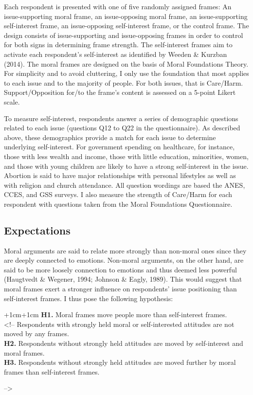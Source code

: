 \documentclass[12pt,econ]{sources/authesis}
\begin{document}
Each respondent is presented with one of five randomly assigned frames: An issue-supporting moral frame, an issue-opposing moral frame, an issue-supporting self-interest frame, an issue-opposing self-interest frame, or the control frame. The design consists of issue-supporting and issue-opposing frames in order to control for both signs in determining frame strength. The self-interest frames aim to activate each respondent's self-interest as identified by Weeden \& Kurzban (2014). The moral frames are designed on the basis of Moral Foundations Theory. For simplicity and to avoid cluttering, I only use the foundation that most applies to each issue and to the majority of people. For both issues, that is Care/Harm. Support/Opposition for/to the frame's content is assessed on a 5-point Likert scale.

To measure self-interest, respondents answer a series of demographic questions related to each issue (questions Q12 to Q22 in the questionnaire). As described above, these demographics provide a match for each issue to determine underlying self-interest. For government spending on healthcare, for instance, those with less wealth and income, those with little education, minorities, women, and those with young children are likely to have a strong self-interest in the issue. Abortion is said to have major relationships with personal lifestyles as well as with religion and church attendance. All question wordings are based the ANES, CCES, and GSS surveys. I also measure the strength of Care/Harm for each respondent with questions taken from the Moral Foundations Questionnaire.

\hypertarget{framing-design-expectations}{%
\subsection{Expectations}\label{framing-design-expectations}}

Moral arguments are said to relate more strongly than non-moral ones since they are deeply connected to emotions. Non-moral arguments, on the other hand, are said to be more loosely connection to emotions and thus deemed less powerful (Haugtvedt \& Wegener, 1994; Johnson \& Eagly, 1989). This would suggest that moral frames exert a stronger influence on respondents' issue positioning than self-interest frames. I thus pose the following hypothesis:

\vspace{0.3cm}
\begin{adjustwidth*}{+1cm}{+1cm}
\noindent \textbf{H1.} Moral frames move people more than self-interest frames.\\

<!-- 
Respondents with strongly held moral or self-interested attitudes are not moved by any frames.\\
\textbf{H2.} Respondents without strongly held attitudes are moved by self-interest and moral frames.\\
\textbf{H3.} Respondents without strongly held attitudes are moved further by moral frames than self-interest frames.
\end{adjustwidth*}
--\textgreater{}
\end{document}
